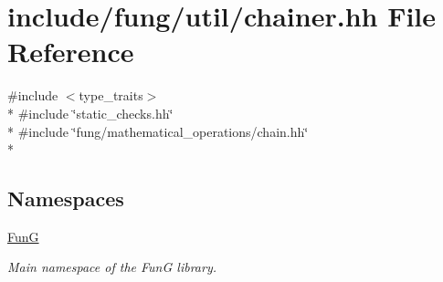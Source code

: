 \hypertarget{chainer_8hh}{\section{include/fung/util/chainer.hh File Reference}
\label{chainer_8hh}
}
{\ttfamily \#include $<$type\-\_\-traits$>$}\\*
{\ttfamily \#include \char`\"{}static\-\_\-checks.\-hh\char`\"{}}\\*
{\ttfamily \#include \char`\"{}fung/mathematical\-\_\-operations/chain.\-hh\char`\"{}}\\*
\subsection*{Namespaces}
\begin{DoxyCompactItemize}
\item 
\hyperlink{namespaceFunG}{Fun\-G}
\begin{DoxyCompactList}\small\item\em Main namespace of the Fun\-G library. \end{DoxyCompactList}\end{DoxyCompactItemize}
